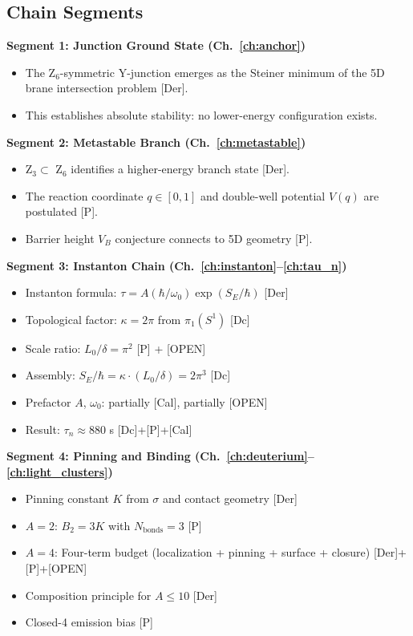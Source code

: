 \subsection{Chain Segments}

\textbf{Segment 1: Junction Ground State (Ch.~\ref{ch:anchor})}
\begin{itemize}
    \item The Z$_6$-symmetric Y-junction emerges as the Steiner minimum
          of the 5D brane intersection problem [Der].
    \item This establishes absolute stability: no lower-energy configuration
          exists.
\end{itemize}

\textbf{Segment 2: Metastable Branch (Ch.~\ref{ch:metastable})}
\begin{itemize}
    \item Z$_3 \subset$ Z$_6$ identifies a higher-energy branch state [Der].
    \item The reaction coordinate $q \in [0,1]$ and double-well potential
          $V(q)$ are postulated [P].
    \item Barrier height $V_B$ conjecture connects to 5D geometry [P].
\end{itemize}

\textbf{Segment 3: Instanton Chain (Ch.~\ref{ch:instanton}--\ref{ch:tau_n})}
\begin{itemize}
    \item Instanton formula: $\tau = A(\hbar/\omega_0)\exp(S_E/\hbar)$ [Der]
    \item Topological factor: $\kappa = 2\pi$ from $\pi_1(S^1)$ [Dc]
    \item Scale ratio: $L_0/\delta = \pi^2$ [P] + [OPEN]
    \item Assembly: $S_E/\hbar = \kappa \cdot (L_0/\delta) = 2\pi^3$ [Dc]
    \item Prefactor $A$, $\omega_0$: partially [Cal], partially [OPEN]
    \item Result: $\tau_n \approx 880$ s [Dc]+[P]+[Cal]
\end{itemize}

\textbf{Segment 4: Pinning and Binding (Ch.~\ref{ch:deuterium}--\ref{ch:light_clusters})}
\begin{itemize}
    \item Pinning constant $K$ from $\sigma$ and contact geometry [Der]
    \item $A = 2$: $B_2 = 3K$ with $N_{\text{bonds}} = 3$ [P]
    \item $A = 4$: Four-term budget (localization + pinning + surface +
          closure) [Der]+[P]+[OPEN]
    \item Composition principle for $A \leq 10$ [Der]
    \item Closed-4 emission bias [P]
\end{itemize}

